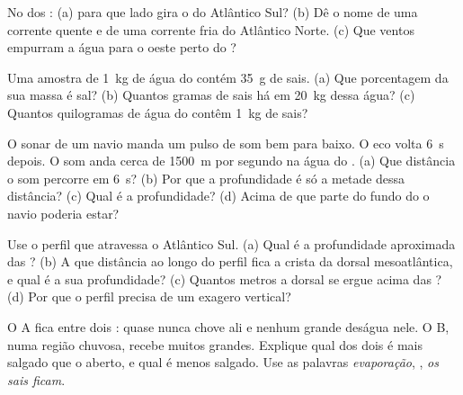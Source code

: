 \begin{exercise}[$\star$]\label{exo:g8:the-oceans:4}
No  dos : (a) para que lado gira o  do Atlântico Sul? (b) Dê
o nome de uma corrente quente e de uma corrente fria do Atlântico Norte.
(c) Que ventos empurram a água para o oeste perto do ?
\end{exercise}

\begin{exercise}[$\star\star$]\label{exo:g8:the-oceans:5}
Uma amostra de \qty{1}{kg} de água do  contém \qty{35}{g} de sais.
(a) Que porcentagem da sua massa é sal? (b) Quantos gramas de sais há em
\qty{20}{kg} dessa água? (c) Quantos quilogramas de água do  contêm
\qty{1}{kg} de sais?
\end{exercise}

\begin{exercise}[$\star\star$]\label{exo:g8:the-oceans:6}
O sonar de um navio manda um pulso de som bem para baixo. O eco volta
\qty{6}{s} depois. O som anda cerca de \qty{1500}{m} por segundo na água
do . (a) Que distância o som percorre em \qty{6}{s}? (b) Por que a
profundidade é só a metade dessa distância? (c) Qual é a profundidade?
(d) Acima de que parte do fundo do  o navio poderia estar?
\end{exercise}

\begin{exercise}[$\star\star$]\label{exo:g8:the-oceans:7}
Use o perfil que atravessa o Atlântico Sul. (a) Qual é a profundidade
aproximada das ? (b) A que distância ao longo do perfil
fica a crista da dorsal mesoatlântica, e qual é a sua profundidade?
(c) Quantos metros a dorsal se ergue acima das ? (d) Por que o
perfil precisa de um exagero vertical?
\end{exercise}

\begin{exercise}[$\star\star$]\label{exo:g8:the-oceans:8}
O  A fica entre dois : quase nunca chove ali e nenhum grande
 deságua nele. O  B, numa região chuvosa, recebe muitos 
grandes. Explique qual dos dois é mais salgado que o  aberto, e qual
é menos salgado. Use as palavras \emph{evaporação}, \emph{},
\emph{os sais ficam}.
\end{exercise}

